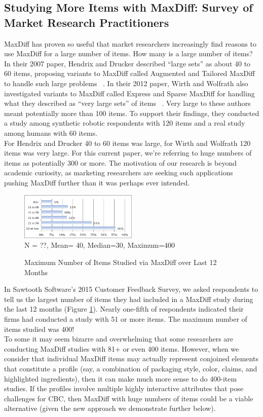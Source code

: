 \documentclass[nonblindrev]{informs3}
\begin{document}
\subsection{Studying More Items with MaxDiff: Survey of Market Research Practitioners}
MaxDiff has proven so useful that market researchers increasingly find reasons to use MaxDiff for a large number of items.  How many is a large number of items?  In their 2007 paper, Hendrix and Drucker described ``large sets'' as about 40 to 60 items, proposing variants to MaxDiff called Augmented and Tailored MaxDiff to handle such large problems ~\cite{hendrix2007alternative}. In their 2012 paper, Wirth and Wolfrath also investigated variants to MaxDiff called Express and Sparse MaxDiff for handling what they described as ``very large sets'' of items ~\cite{wirth2012largeset}.  Very large to these authors meant potentially more than 100 items.  To support their findings, they conducted a study among synthetic robotic respondents with 120 items and a real study among humans with 60 items.\\
For Hendrix and Drucker 40 to 60 items was large, for Wirth and Wolfrath 120 items was very large.  For this current paper, we're referring to huge numbers of items as potentially 300 or more. The motivation of our research is beyond academic curiosity, as marketing researchers are seeking such applications pushing MaxDiff further than it was perhaps ever intended. \\
\begin{figure}
\caption{Maximum Number of Items Studied via MaxDiff over Last 12 Months}
\includegraphics[width=0.5\textwidth]{plots/maxnumstudy}\\
N = ??, Mean= 40, Median=30, Maximum=400
\label{fig:max}
\end{figure}
In Sawtooth Software's 2015 Customer Feedback Survey, we asked respondents to tell us the largest number of items they had included in a MaxDiff study during the last 12 months (Figure \ref{fig:max}). Nearly one-fifth of respondents indicated their firms had conducted a study with 51 or more items.  The maximum number of items studied was 400!\\
To some it may seem bizarre and overwhelming that some researchers are conducting MaxDiff studies with 81+ or even 400 items.  However, when we consider that individual MaxDiff items may actually represent conjoined elements that constitute a profile (say, a combination of packaging style, color, claims, and highlighted ingredients), then it can make much more sense to do 400-item studies.  If the profiles involve multiple highly interactive attributes that pose challenges for CBC, then MaxDiff with huge numbers of items could be a viable alternative (given the new approach we demonstrate further below).\\
\end{document}
